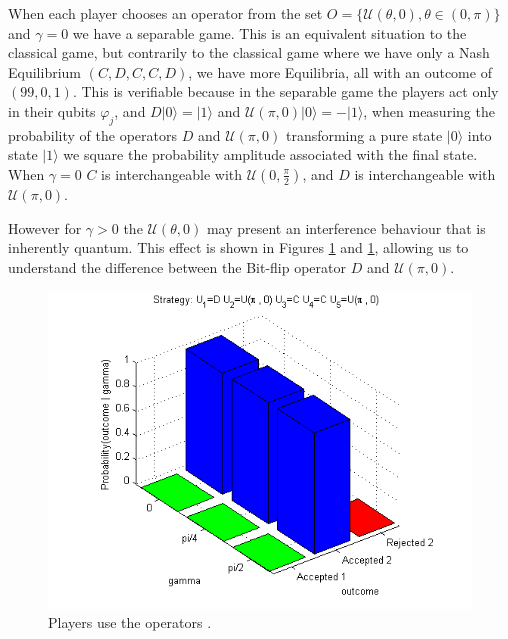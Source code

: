 \documentclass[10pt]{llncs}
\begin{document}
When each player chooses an operator from the set $O = \{ \mathcal{U} ( \theta , 0) , \theta \in (0, \pi) \}$ and $\gamma=0$ we have a separable game. This is an equivalent situation to the classical game, but contrarily to the classical game where we have only a Nash Equilibrium $(C,D,C,C,D)$, we have more Equilibria, all with an outcome of $(99, 0, 1)$. This is verifiable because in the separable game the players act only in their qubits $\varphi_{j}$, and $D\vert 0\rangle =\vert 1 \rangle$ and $\mathcal{U}( \pi, 0) \vert 0 \rangle = - \vert 1 \rangle $, when measuring the probability of the operators $D$ and $\mathcal{U}( \pi, 0)$ transforming a pure state $\vert 0 \rangle$ into state $\vert 1 \rangle$ we square the probability amplitude associated with the final state. When $\gamma = 0$  $C$ is interchangeable with $\mathcal{U}(0, \frac{\pi}{2})$, and $D$ is interchangeable with $\mathcal{U}( \pi, 0)$.

However for $\gamma >0$ the $\mathcal{U} ( \theta , 0)$ may present an interference behaviour that is inherently quantum. This effect is shown in Figures \ref{fig:pg_3players_99_0_1:2} and \ref{fig:pg_3players_99_0_1:2}, allowing us to understand the difference between the Bit-flip operator $D$ and $\mathcal{U} ( \pi , 0)$.



\begin{figure}[!h]
\centering 
\includegraphics[scale=0.50]{Figures/1.5qubit/DUpi0CCUpi0.png}
\caption{Players use the operators . }
\label{fig:pg_3players_99_0_1:2}
\end{figure}
\end{document}

